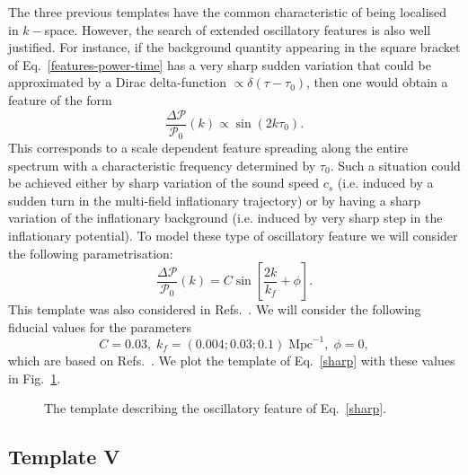 \documentclass[12pt]{article}
\newcommand{\be}{\begin{equation}}
\newcommand{\ee}{\end{equation}}
\begin{document}
The three previous templates have the common characteristic of being localised in $k-$space. However, the search of extended oscillatory features is also well justified. For instance, if the background quantity appearing in the square bracket of Eq.~\eqref{features-power-time} has a very sharp sudden variation that could be approximated by a Dirac delta-function $\propto \delta(\tau - \tau_0)$, then one would obtain a feature of the form
\be
\frac{\Delta \mathcal P}{\mathcal P_0 } (k)  \propto  \sin (2 k \tau_0 ).
\ee
This corresponds to a scale dependent feature spreading along the entire spectrum with a characteristic frequency determined by $\tau_0$. Such a situation could be achieved either by sharp variation of the sound speed $c_s$ (i.e. induced by a sudden turn in the multi-field inflationary trajectory) or by having a sharp variation of the inflationary background (i.e. induced by very sharp step in the inflationary potential). To model these type of oscillatory feature we will consider the following parametrisation:
\be
\frac{\Delta \mathcal P}{\mathcal P_0 }(k)  = C\sin\left[\frac{2k}{k_f}+\phi\right]. \label{sharp} 
\ee
This template was also considered in Refs.~\cite{Chen:2011zf,Fergusson:2014hya,Fergusson:2014tza,Meerburg:2015owa}. We will consider the following fiducial values for the parameters
\be
C= 0.03, \; k_f = (0.004;0.03;0.1)\;\text{Mpc}^{-1},\; \phi = 0, \label{sin-fid}
\ee
which are based on Refs.~\cite{Chen:2016vvw,Ade:2015lrj}. We plot the template of Eq.~\eqref{sharp} with these values in Fig.~\ref{fig:template-IV}.
%
\begin{figure}[h]
\centering
{}
\caption{The template describing the oscillatory feature of Eq.~\eqref{sharp}.}
\label{fig:template-IV}
\end{figure}
%


\subsection{Template V}
\end{document}
